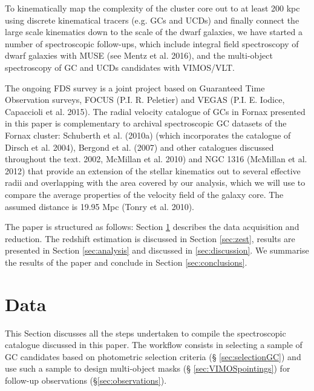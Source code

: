 \documentclass[useAMS,usenatbib]{mn2e}
\begin{document}
To kinematically map the complexity of the cluster core out to at least 200 kpc 
using discrete kinematical tracers (e.g. GCs and UCDs) and finally connect the 
large scale kinematics down to the scale of the dwarf galaxies, we have started 
a number of spectroscopic follow-ups, which include integral field spectroscopy 
of dwarf galaxies with MUSE (see Mentz et al. 2016), and the multi-object 
spectroscopy  of GC and UCDs candidates with VIMOS/VLT.

The ongoing FDS survey is a joint project based on Guaranteed Time Observation 
surveys, FOCUS (P.I. R. Peletier) and VEGAS (P.I. E. Iodice, Capaccioli et al. 
2015).
The radial velocity catalogue of GCs in Fornax presented in this paper is 
complementary to archival spectroscopic GC datasets of the Fornax cluster: 
Schuberth et al. (2010a) (which incorporates the catalogue of Dirsch et al. 
2004), Bergond et al. (2007) and other catalogues discussed throughout the 
text. 
2002, McMillan et al. 2010) and NGC 1316 (McMillan et al. 2012) that provide an 
extension of the stellar kinematics out to several effective radii and 
overlapping with the area covered by our analysis, which we will use to compare 
the average properties of the velocity field of the galaxy core.
The assumed distance is 19.95 Mpc (Tonry et al. 2010).  

The paper is structured as follows: Section \ref{sec:data} describes the data 
acquisition and reduction. The redshift estimation is discussed in Section 
\ref{sec:zest}, results are presented in Section \ref{sec:analysis} and 
discussed in \ref{sec:discussion}. We summarise the results of the paper and 
conclude in Section \ref{sec:conclusions}. 

\section{Data}
\label{sec:data}

This Section discusses all the steps undertaken to compile the spectroscopic 
catalogue discussed in this paper. The 
workflow consists in selecting a sample of GC candidates based on photometric 
selection criteria (\S 
\ref{sec:selectionGC}) and use such a sample to design multi-object masks (\S 
\ref{sec:VIMOSpointings}) for follow-up 
observations (\S \ref{sec:observations}).
\end{document}
